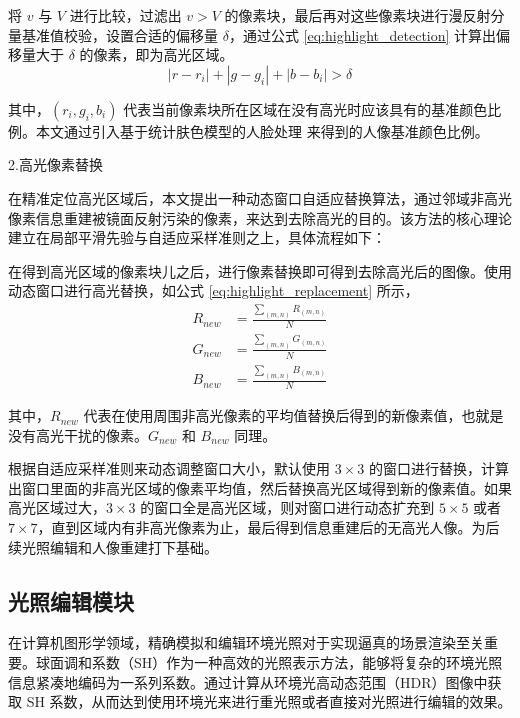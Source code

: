 将 \(v\) 与 \(V\) 进行比较，过滤出 \(v > V\) 的像素块，最后再对这些像素块进行漫反射分量基准值校验，设置合适的偏移量 \(\delta\)，通过公式 \eqref{eq:highlight_detection} 计算出偏移量大于 \(\delta\) 的像素，即为高光区域。
\begin{equation}
\label{eq:highlight_detection}
|r - r_i| + |g - g_i| + |b - b_i| > \delta
\end{equation}

其中，\((r_i, g_i, b_i)\) 代表当前像素块所在区域在没有高光时应该具有的基准颜色比例。本文通过引入基于统计肤色模型的人脸处理\cite{Kakumanu2007} 来得到的人像基准颜色比例。

2.高光像素替换

在精准定位高光区域后，本文提出一种动态窗口自适应替换算法，通过邻域非高光像素信息重建被镜面反射污染的像素，来达到去除高光的目的。该方法的核心理论建立在局部平滑先验\cite{Buades2005}与自适应采样准则\cite{Efros1999}之上，具体流程如下：

在得到高光区域的像素块儿之后，进行像素替换即可得到去除高光后的图像。使用动态窗口进行高光替换，如公式 \eqref{eq:highlight_replacement} 所示，
\begin{equation}
\label{eq:highlight_replacement}
\begin{aligned}
R_{new} &= \frac{\sum_{(m,n)} R_{(m,n)}}{N} \\
G_{new} &= \frac{\sum_{(m,n)} G_{(m,n)}}{N} \\
B_{new} &= \frac{\sum_{(m,n)} B_{(m,n)}}{N}
\end{aligned}
\end{equation}

其中，\(R_{new}\) 代表在使用周围非高光像素的平均值替换后得到的新像素值，也就是没有高光干扰的像素。\(G_{new}\) 和 \(B_{new}\) 同理。

根据自适应采样准则来动态调整窗口大小，默认使用 \(3 \times 3\) 的窗口进行替换，计算出窗口里面的非高光区域的像素平均值，然后替换高光区域得到新的像素值。如果高光区域过大，\(3 \times 3\) 的窗口全是高光区域，则对窗口进行动态扩充到 \(5 \times 5\) 或者 \(7 \times 7\)，直到区域内有非高光像素为止，最后得到信息重建后的无高光人像。为后续光照编辑和人像重建打下基础。

\subsection{光照编辑模块}
在计算机图形学领域，精确模拟和编辑环境光照对于实现逼真的场景渲染至关重要。球面调和系数（SH）作为一种高效的光照表示方法，能够将复杂的环境光照信息紧凑地编码为一系列系数。通过计算从环境光高动态范围（HDR）图像中获取 SH 系数，从而达到使用环境光来进行重光照或者直接对光照进行编辑的效果。

